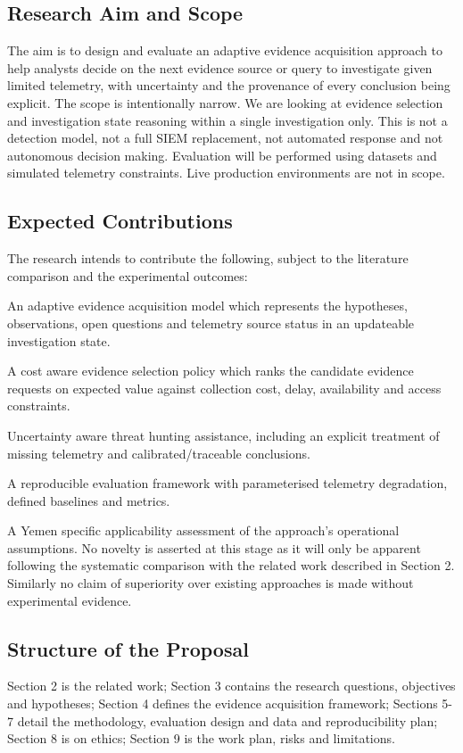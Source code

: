 \documentclass[a4paper,11pt]{article}
\begin{document}
\subsection{Research Aim and Scope}
The aim is to design and evaluate an adaptive evidence acquisition approach to help analysts decide on the next evidence source or query to investigate given limited telemetry, with uncertainty and the provenance of every conclusion being explicit. The scope is intentionally narrow. We are looking at evidence selection and investigation state reasoning within a single investigation only. This is not a detection model, not a full SIEM replacement, not automated response and not autonomous decision making. Evaluation will be performed using datasets and simulated telemetry constraints. Live production environments are not in scope.\par
\subsection{Expected Contributions}
The research intends to contribute the following, subject to the literature comparison and the experimental outcomes:\par
An adaptive evidence acquisition model which represents the hypotheses, observations, open questions and telemetry source status in an updateable investigation state.\par
A cost aware evidence selection policy which ranks the candidate evidence requests on expected value against collection cost, delay, availability and access constraints.\par
Uncertainty aware threat hunting assistance, including an explicit treatment of missing telemetry and calibrated/traceable conclusions.\par
A reproducible evaluation framework with parameterised telemetry degradation, defined baselines and metrics.\par
A Yemen specific applicability assessment of the approach's operational assumptions. No novelty is asserted at this stage as it will only be apparent following the systematic comparison with the related work described in Section 2. Similarly no claim of superiority over existing approaches is made without experimental evidence.\par
\subsection{Structure of the Proposal}
Section 2 is the related work; Section 3 contains the research questions, objectives and hypotheses; Section 4 defines the evidence acquisition framework; Sections 5-7 detail the methodology, evaluation design and data and reproducibility plan; Section 8 is on ethics; Section 9 is the work plan, risks and limitations.\par
\end{document}
